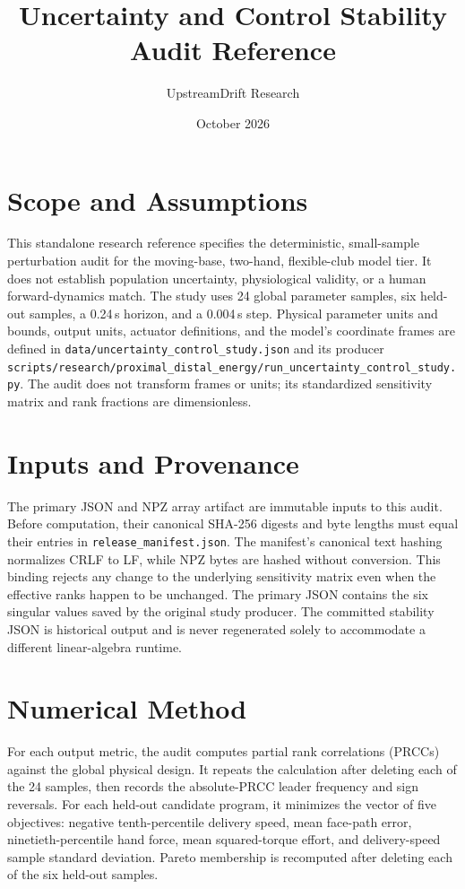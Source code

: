 \documentclass[11pt]{article}
\title{Uncertainty and Control Stability Audit Reference}
\author{UpstreamDrift Research}
\date{October 2026}
\begin{document}
\maketitle

\section{Scope and Assumptions}
This standalone research reference specifies the deterministic, small-sample
perturbation audit for the moving-base, two-hand, flexible-club model tier. It
does not establish population uncertainty, physiological validity, or a human
forward-dynamics match. The study uses 24 global parameter samples, six held-out
samples, a 0.24\,s horizon, and a 0.004\,s step. Physical parameter units and
bounds, output units, actuator definitions, and the model's coordinate frames
are defined in \texttt{data/uncertainty\_control\_study.json} and its producer
\texttt{scripts/research/proximal\_distal\_energy/run\_uncertainty\_control\_study.py}.
The audit does not transform frames or units; its standardized sensitivity
matrix and rank fractions are dimensionless.

\section{Inputs and Provenance}
The primary JSON and NPZ array artifact are immutable inputs to this audit.
Before computation, their canonical SHA-256 digests and byte lengths must equal
their entries in \texttt{release\_manifest.json}. The manifest's canonical text
hashing normalizes CRLF to LF, while NPZ bytes are hashed without conversion.
This binding rejects any change to the underlying sensitivity matrix even when
the effective ranks happen to be unchanged. The primary JSON contains the six
singular values saved by the original study producer. The committed stability
JSON is historical output and is never regenerated solely to accommodate a
different linear-algebra runtime.

\section{Numerical Method}
For each output metric, the audit computes partial rank correlations (PRCCs)
against the global physical design. It repeats the calculation after deleting
each of the 24 samples, then records the absolute-PRCC leader frequency and
sign reversals. For each held-out candidate program, it minimizes the vector
of five objectives: negative tenth-percentile delivery speed, mean face-path
error, ninetieth-percentile hand force, mean squared-torque effort, and
delivery-speed sample standard deviation. Pareto membership is recomputed after
deleting each of the six held-out samples.
\end{document}
